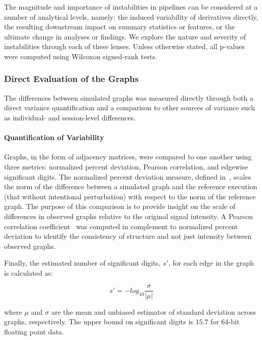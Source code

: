 \documentclass[fleqn,10pt]{SelfArx} %
\begin{document}
The magnitude and importance of instabilities in pipelines can be considered at a number of analytical levels, namely:
the induced variability of derivatives directly, the resulting downstream impact on summary statistics or features, or
the ultimate change in analyses or findings. We explore the nature and severity of instabilities through each of these
lenses. Unless otherwise stated, all p-values were computed using Wilcoxon signed-rank tests.

\subsubsection*{Direct Evaluation of the Graphs}

The differences between simulated graphs was measured directly through both a direct variance quantification and a
comparison to other sources of variance such as individual- and session-level differences.

\paragraph{Quantification of Variability}
Graphs, in the form of adjacency matrices, were compared to one another using three metrics: normalized percent
deviation, Pearson correlation, and edgewise significant digits. The normalized percent deviation measure, defined
in~\cite{Kiar2020-lb}, scales the norm of the difference between a simulated graph and the reference execution (that
without intentional perturbation) with respect to the norm of the reference graph. The purpose of this comparison is
to provide insight on the scale of differences in observed graphs relative to the original signal intensity. A Pearson
correlation coefficient~\cite{Benesty2009-cb} was computed in complement to normalized percent deviation to identify
the consistency of structure and not just intensity between observed graphs.

Finally, the estimated number of significant digits, $s'$, for each edge in the graph is calculated as:

\begin{equation}
s' = -log_{10}\frac{\sigma}{\lvert\mu\rvert}
\label{eq:sigdig}
\end{equation}

where $\mu$ and $\sigma$ are the mean and unbiased estimator of standard deviation across graphs, respectively. The
upper bound on significant digits is $15.7$ for 64-bit floating point data.
\end{document}
